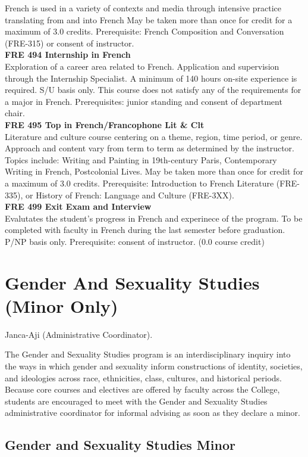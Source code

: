 \documentclass[
  letterpaper,
]{scrbook}
\begin{document}
French is used in a variety of contexts and media through intensive
practice translating from and into French May be taken more than once
for credit for a maximum of 3.0 credits. Prerequisite: French
Composition and Conversation (FRE-315) or consent of instructor.\\
\textbf{FRE 494 Internship in French}\\
Exploration of a career area related to French. Application and
supervision through the Internship Specialist. A minimum of 140 hours
on-site experience is required. S/U basis only. This course does not
satisfy any of the requirements for a major in French. Prerequisites:
junior standing and consent of department chair.\\
\textbf{FRE 495 Top in French/Francophone Lit \& Clt}\\
Literature and culture course centering on a theme, region, time period,
or genre. Approach and content vary from term to term as determined by
the instructor. Topics include: Writing and Painting in 19th-century
Paris, Contemporary Writing in French, Postcolonial Lives. May be taken
more than once for credit for a maximum of 3.0 credits. Prerequisite:
Introduction to French Literature (FRE- 335), or History of French:
Language and Culture (FRE-3XX).\\
\textbf{FRE 499 Exit Exam and Interview}\\
Evalutates the student's progress in French and experinece of the
program. To be completed with faculty in French during the last semester
before graduation. P/NP basis only. Prerequisite: consent of instructor.
(0.0 course credit)

\section{Gender And Sexuality Studies (Minor
Only)}\label{sec-gender-and-sexuality-studies}

Janca-Aji (Administrative Coordinator).

The Gender and Sexuality Studies program is an interdisciplinary inquiry
into the ways in which gender and sexuality inform constructions of
identity, societies, and ideologies across race, ethnicities, class,
cultures, and historical periods. Because core courses and electives are
offered by faculty across the College, students are encouraged to meet
with the Gender and Sexuality Studies administrative coordinator for
informal advising as soon as they declare a minor.

\subsection{Gender and Sexuality Studies
Minor}\label{gender-and-sexuality-studies-minor}
\end{document}

